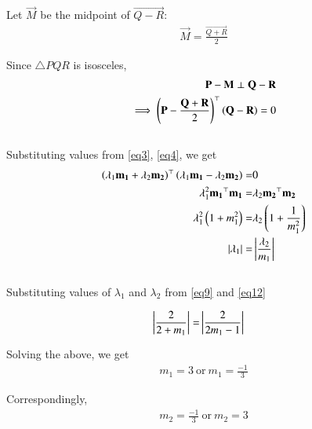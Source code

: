 \documentclass[journal]{IEEEtran}
\begin{document}
Let $\vec{M}$ be the midpoint of $\vec{Q-R}$:
\begin{align}
    \vec{M} = \frac{\vec{Q+R}}{2}
\end{align}

Since $\triangle PQR$ is isosceles,
\begin{align}
    \mathbf{P}-\mathbf{M} \perp \mathbf{Q}-\mathbf{R}\\
    \implies \left(\mathbf{P}-\frac{\mathbf{Q+R}}{2}\right)^\top \left(\mathbf{Q}-\mathbf{R}\right) = 0
\end{align}\\

Substituting values from \eqref{eq3}, \eqref{eq4}, we get
\begin{align}
    \left(\lambda_1\mathbf{m_1}+\lambda_2\mathbf{m_2}\right)^\top\left(\lambda_1\mathbf{m_1}-\lambda_2\mathbf{m_2}\right) =& 0\\
    \lambda_1^2\mathbf{m_1}^\top\mathbf{m_1} =& \lambda_2\mathbf{m_2}^\top\mathbf{m_2}\\
    \lambda_1^2\left(1+m_1^2\right) =& \lambda_2\left(1+\frac{1}{m_1^2}\right)\\
    \left\vert\lambda_1\right\vert=& \left\vert\frac{\lambda_2}{m_1}\right\vert
\end{align}\\

Substituting values of $\lambda_1$ and $\lambda_2$ from \eqref{eq9} and \eqref{eq12}

\begin{align}
    \left\vert \frac{2}{2+m_1}\right\vert =& \left\vert\frac{2}{2m_1-1}\right\vert
\end{align}


 

Solving the above, we get
\begin{align}
    m_1 = 3 \ \text{or} \ m_1 = \frac{-1}{3}
\end{align}

Correspondingly,
\begin{align}
    m_2 = \frac{-1}{3} \ \text{or} \ m_2 = 3
\end{align}\\
\end{document}
